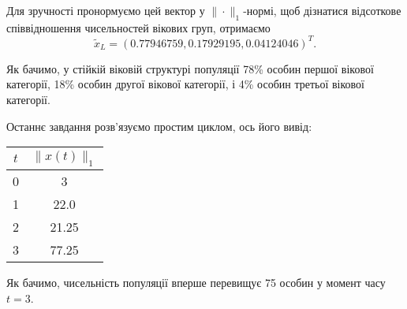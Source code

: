 Для зручності пронормуємо цей вектор у $\|\cdot\|_1$-нормі, щоб дізнатися відсоткове співвідношення чисельностей вікових груп, отримаємо \[ \tilde x_L = (0.77946759, 0.17929195, 0.04124046)^T. \]

Як бачимо, у стійкій віковій структурі популяції 78\% особин першої вікової категорії, 18\% особин другої вікової категорії, і 4\% особин третьої вікової категорії. \medskip

Останнє завдання розв'язуємо простим циклом, ось його вивід:
\begin{table}[H]
	\centering
	\begin{tabular}{|c|c|} \hline
		$t$ & $\|x(t)\|_1$ \\ \hline
		0 & 3 \\ \hline
		1 & 22.0 \\ \hline
		2 & 21.25 \\ \hline
		3 & 77.25 \\ \hline
	\end{tabular}
\end{table}

Як бачимо, чисельність популяції вперше перевищує 75 особин у момент часу $t = 3$.

